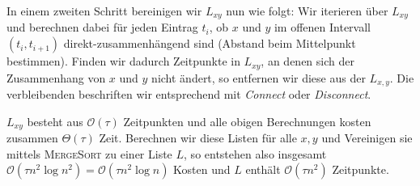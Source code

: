 In einem zweiten Schritt bereinigen wir $L_{xy}$ nun wie folgt: Wir iterieren über $L_{xy}$ und berechnen dabei für jeden Eintrag $t_i$, ob $x$ und $y$ im offenen Intervall $(t_i,t_{i+1})$ direkt-zusammenhängend sind (Abstand beim Mittelpunkt bestimmen). 
Finden wir dadurch Zeitpunkte in $L_{xy}$, an denen sich der Zusammenhang von $x$ und $y$ nicht ändert, so entfernen wir diese aus der $L_{x,y}$.
Die verbleibenden beschriften wir entsprechend mit \emph{Connect} oder \emph{Disconnect}.

$L_{xy}$ besteht aus $\mathcal{O}(\tau)$ Zeitpunkten und alle obigen Berechnungen kosten zusammen $\Theta(\tau)$ Zeit.
Berechnen wir diese Listen für alle $x,y$ und Vereinigen sie mittels \textsc{MergeSort} zu einer Liste $L$, so entstehen also insgesamt $\mathcal{O}(\tau n^2 \log n^2) = \mathcal{O}(\tau n^2 \log n)$ Kosten und $L$ enthält $\mathcal{O}(\tau n^2)$ Zeitpunkte.


